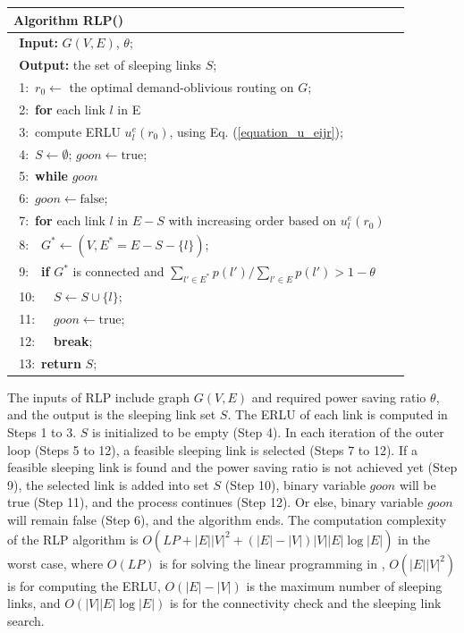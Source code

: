 \documentclass[conference]{IEEEtran}
\begin{document}
\begin{table}[!th]
\begin{tabular}{ll}
\hline
\textbf{Algorithm RLP()}\\
\hline
$\:\:$\textbf{Input:} $G(V, E)$, $\theta$;\\
$\:\:$\textbf{Output:} the set of sleeping links $S$;\\
$\:\:$1:\ $r_0 \leftarrow$ the optimal demand-oblivious routing \cite{networking:oblivious} on $G$;\\
$\:\:$2:\ \textbf{for} each link $l$ in E\\
$\:\:$3:\quad\ compute ERLU $u^e_l(r_0)$, using Eq. (\ref{equation_u_eijr});\\
$\:\:$4:\ $S \leftarrow \emptyset$; $goon \leftarrow \textrm{true}$;\\
$\:\:$5:\ \textbf{while} {$goon$}\\
$\:\:$6:\quad\ $goon \leftarrow \textrm{false}$;\\
$\:\:$7:\quad\ \textbf{for} {each link $l$ in $E-S$ with increasing order based on $u^e_l(r_0)$}\\
$\:\:$8:\quad\ \quad\ $G^* \leftarrow (V, E^* = E-S-\{l\})$;\\
$\:\:$9:\quad\ \quad\ \textbf{if} {$G^*$ is connected and $\sum_{l' \in E^*} p(l') / \sum_{l' \in E} p(l') > 1 - \theta$}\\
$\:\:$10:\quad\ \quad\ \quad\ $S \leftarrow S \cup \{l\}$;\\
$\:\:$11:\quad\ \quad\ \quad\ $goon \leftarrow \textrm{true}$;\\
$\:\:$12:\quad\ \quad\ \quad\ \textbf{break};\\
$\:\:$13:\ \textbf{return} $S$;\\
\hline
\end{tabular}
\end{table}

The inputs of RLP include graph $G(V, E)$ and required power saving ratio $\theta$, and the output is the sleeping link set $S$. The ERLU of each link is computed in Steps 1 to 3. $S$ is initialized to be empty (Step 4). In each iteration of the outer loop (Steps 5 to 12), a feasible sleeping link is selected (Steps 7 to 12). If a feasible sleeping link is found and the power saving ratio is not achieved yet (Step 9), the selected link is added into set $S$ (Step 10), binary variable $goon$ will be true (Step 11), and the process continues (Step 12). Or else, binary variable $goon$ will remain false (Step 6), and the algorithm ends. The computation complexity of the RLP algorithm is $O(LP + |E||V|^2 + (|E|-|V|)|V||E|\log|E|)$ in the worst case, where $O(LP)$ is for solving the linear programming in \cite{networking:oblivious}, $O(|E||V|^2)$ is for computing the ERLU, $O(|E|-|V|)$ is the maximum number of sleeping links, and $O(|V||E|\log|E|)$ is for the connectivity check and the sleeping link search.
\end{document}

